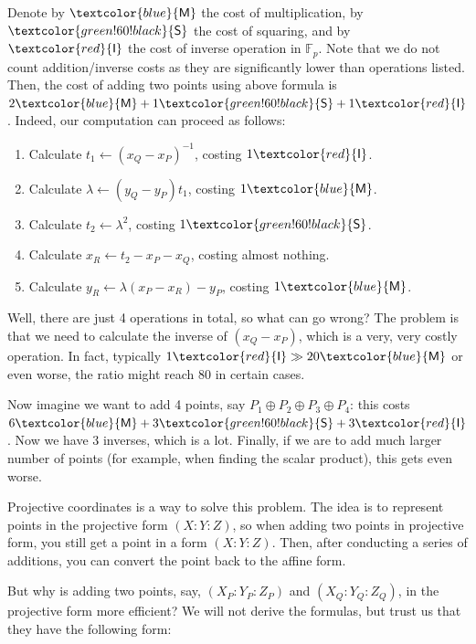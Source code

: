 \documentclass[../../book.tex]{subfiles}
\begin{document}
Denote by $\textcolor{blue}{\mathsf{M}}$ the cost of multiplication, by $\textcolor{green!60!black}{\mathsf{S}}$ the cost of squaring, and by $\textcolor{red}{\mathsf{I}}$ the cost of inverse operation in $\mathbb{F}_p$. Note that we do not count addition/inverse costs as they are significantly lower than operations listed. Then, the cost of adding two points using above formula is $2\textcolor{blue}{\mathsf{M}} + 1\textcolor{green!60!black}{\mathsf{S}} + 1\textcolor{red}{\mathsf{I}}$. Indeed, our computation can proceed as follows:
\begin{enumerate}
    \item Calculate $t_1 \gets (x_Q-x_P)^{-1}$, costing $1\textcolor{red}{\mathsf{I}}$.
    \item Calculate $\lambda \gets (y_Q-y_P)t_1$, costing $1\textcolor{blue}{\mathsf{M}}$.
    \item Calculate $t_2 \gets \lambda^2$, costing $1\textcolor{green!60!black}{\mathsf{S}}$.
    \item Calculate $x_R \gets t_2 - x_P - x_Q$, costing almost nothing.
    \item Calculate $y_R \gets \lambda (x_P-x_R) - y_P$, costing $1\textcolor{blue}{\mathsf{M}}$.
\end{enumerate}

Well, there are just 4 operations in total, so what can go wrong? The problem is that we need to calculate the inverse of $(x_Q-x_P)$, which is a very, very costly operation. In fact, typically $1\textcolor{red}{\mathsf{I}} \gg 20\textcolor{blue}{\mathsf{M}}$ or even worse, the ratio might reach $80$ in certain cases.

Now imagine we want to add 4 points, say $P_1 \oplus P_2 \oplus P_3 \oplus P_4$: this costs $6\textcolor{blue}{\mathsf{M}} + 3\textcolor{green!60!black}{\mathsf{S}} + 3\textcolor{red}{\mathsf{I}}$. Now we have 3 inverses, which is a lot. Finally, if we are to add much larger number of points (for example, when finding the scalar product), this gets even worse. 

Projective coordinates is a way to solve this problem. The idea is to represent points in the projective form $(X:Y:Z)$, so when adding two points in projective form, you still get a point in a form $(X:Y:Z)$. Then, after conducting a series of additions, you can convert the point back to the affine form. 

But why is adding two points, say, $(X_P:Y_P:Z_P)$ and $(X_Q:Y_Q:Z_Q)$, in the projective form more efficient? We will not derive the formulas, but trust us that they have the following form:
\begin{xequation*}
\end{xequation*}
\end{document}
